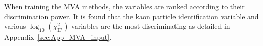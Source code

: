 When training the MVA methods, the variables are ranked according to their discrimination power. 
It is found that the kaon particle identification variable and various $\log_{10}(\chi^{2}_{\text{IP}})$ variables are the most discriminating as detailed in Appendix~\ref{sec:App_MVA_input}.




